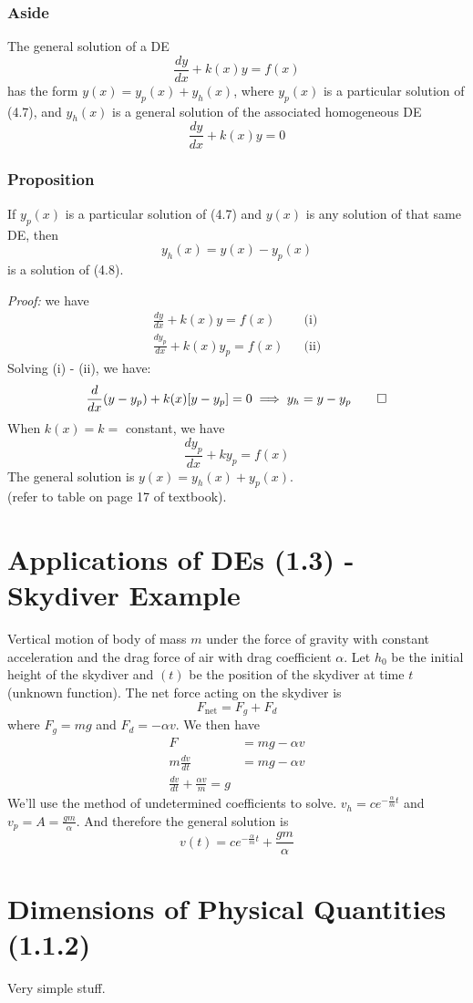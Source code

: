\documentclass{report}
\begin{document}
\subsubsection{Aside}
The general solution of a DE
\begin{equation}
\frac{dy}{dx} + k(x)y = f(x)    
\end{equation}
has the form $y(x) = y_p(x) + y_h(x)$, where $y_p(x)$ is a particular solution of (4.7), and $y_h(x)$ is a general solution of the associated homogeneous DE
\begin{equation}
\frac{dy}{dx} + k(x)y = 0    
\end{equation}
\subsubsection{Proposition}
If $y_p(x)$ is a particular solution of (4.7) and $y(x)$ is any solution of that same DE, then
$$y_h(x) = y(x) - y_p(x)$$
is a solution of (4.8).

\vspace{0.3cm}\noindent \textit{Proof:} we have
\begin{align*}
    \frac{dy}{dx} + k(x)y = f(x) && \text{(i)}\\
    \frac{dy_p}{dx} + k(x)y_p = f(x) && \text{(ii)}
\end{align*}
Solving (i) - (ii), we have:
$$\frac{d}{dx}(y - y_p) + k(x)[y - y_p] = 0 \implies y_h = y - y_p \qed$$
When $k(x) = k = $ constant, we have
$$\frac{dy_p}{dx} + ky_p = f(x)$$
The general solution is $y(x) = y_h(x) + y_p(x)$. \\
(refer to table on page 17 of textbook).
\section{Applications of DEs (1.3) - Skydiver Example}
Vertical motion of body of mass $m$ under the force of gravity with constant acceleration and the drag force of air with drag coefficient $\alpha$. Let $h_0$ be the initial height of the skydiver and $(t)$ be the position of the skydiver at time $t$ (unknown function). The net force acting on the skydiver is
$$F_{\text{net}} = F_g + F_d$$
where $F_g = mg$ and $F_d = -\alpha v$. We then have
\begin{align}
    F &= mg - \alpha v \\
    m \frac{dv}{dt} &= mg - \alpha v \\
    \frac{dv}{dt} + \frac{\alpha v}{m} = g
\end{align}
We'll use the method of undetermined coefficients to solve. $v_h = ce^{-\frac{\alpha}{m}t}$ and $v_p = A = \frac{gm}{\alpha}$. And therefore the general solution is
$$v(t) = ce^{-\frac{\alpha}{m}t} + \frac{gm}{\alpha}$$
\section{Dimensions of Physical Quantities (1.1.2)}
Very simple stuff.
\end{document}
